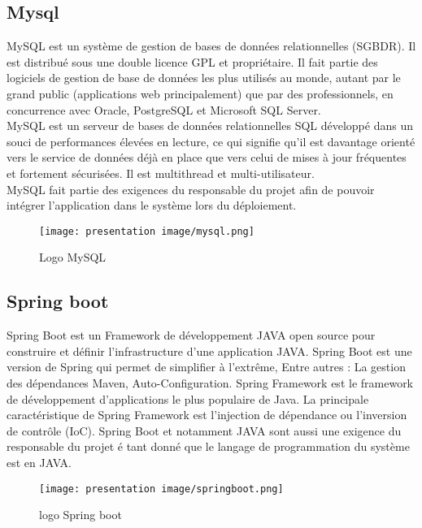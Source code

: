 \subsection{Mysql}
MySQL est un système de gestion de bases de données relationnelles (SGBDR). Il est distribué sous une double licence GPL et propriétaire. Il fait partie des logiciels de gestion de base de données les plus utilisés au monde, autant par le grand public (applications web principalement) que par des professionnels, en concurrence avec Oracle, PostgreSQL et Microsoft SQL Server.\\

MySQL est un serveur de bases de données relationnelles SQL développé dans un souci de performances élevées en lecture, ce qui signifie qu'il est davantage orienté vers le service de données déjà en place que vers celui de mises à jour fréquentes et fortement sécurisées. Il est multithread et multi-utilisateur.\\

MySQL fait partie des exigences du responsable du projet afin de pouvoir intégrer l’application dans le système lors du déploiement.
\newpage
\begin{figure}[!h]
\begin{center}
\texttt{[image: presentation image/mysql.png]}
\end{center}
\caption{Logo MySQL}
\end{figure}

\subsection{Spring boot}
Spring Boot est un Framework de développement JAVA open source pour construire et définir l’infrastructure d’une application JAVA. Spring Boot est une version de Spring qui permet de simplifier à l’extrême, Entre autres :
La gestion des dépendances Maven, Auto-Configuration.
Spring Framework est le framework de développement d'applications le plus populaire de Java. La principale caractéristique de Spring Framework est l’injection de dépendance ou l’inversion de contrôle (IoC).
Spring Boot et notamment JAVA sont aussi une exigence du responsable du projet é tant donné que le langage de programmation du système est en JAVA.
\begin{figure}[!h]
\begin{center}
\texttt{[image: presentation image/springboot.png]}
\end{center}
\caption{logo Spring boot}
\end{figure}

